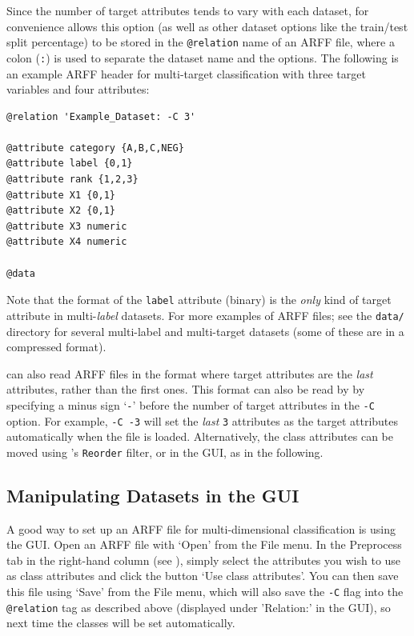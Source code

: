 \documentclass[11pt]{article}
\newcommand{\MEKA}{Meka}
\newcommand{\WEKA}{Weka}
\newcommand{\MULAN}{Mulan}
\begin{document}
Since the number of target attributes tends to vary with each dataset, for convenience \framework{\MEKA} allows this option (as well as other dataset options like the train/test split percentage) to be stored in the \texttt{@relation} name of an ARFF file, where a colon (\texttt{:}) is used to separate the dataset name and the options. The following is an example ARFF header for multi-target classification with three target variables and four attributes:
 
{\small

\begin{lstlisting}
@relation 'Example_Dataset: -C 3'

@attribute category {A,B,C,NEG}
@attribute label {0,1}
@attribute rank {1,2,3}
@attribute X1 {0,1}
@attribute X2 {0,1}
@attribute X3 numeric
@attribute X4 numeric

@data
\end{lstlisting}
}

Note that the format of the \texttt{label} attribute (binary) is the \emph{only} kind of target attribute in multi-\emph{label} datasets. For more examples of \framework{\MEKA} ARFF files; see the \texttt{data/} directory for several multi-label and multi-target datasets (some of these are in a compressed format).

\framework{\MEKA} can also read ARFF files in the \framework{\MULAN} format where target attributes are the \emph{last} attributes, rather than the first ones. This format can also be read by \framework{\MEKA} by specifying a minus sign `\texttt{-}' before the number of target attributes in the \texttt{-C} option. For example, \texttt{-C -3} will set the \emph{last} \texttt{3} attributes as the target attributes automatically when the file is loaded. Alternatively, the class attributes can be moved using \framework{\WEKA}'s \texttt{Reorder} filter, or in the GUI, as in the following. %


\subsection{Manipulating Datasets in the GUI}
\label{sec:data.gui}

A good way to set up an ARFF file for multi-dimensional classification is using the GUI. Open an ARFF file with `\textsf{Open}' from the \textsf{File} menu. In the \textsf{Preprocess} tab in the right-hand column (see ), simply select the attributes you wish to use as class attributes and click the button `\textsf{Use class attributes}'. You can then save this file using `\textsf{Save}' from the \textsf{File} menu, which will also save the \texttt{-C} flag into the \texttt{@relation} tag as described above (displayed under '\textsf{Relation:}' in the GUI), so next time the classes will be set automatically.
\end{document}
